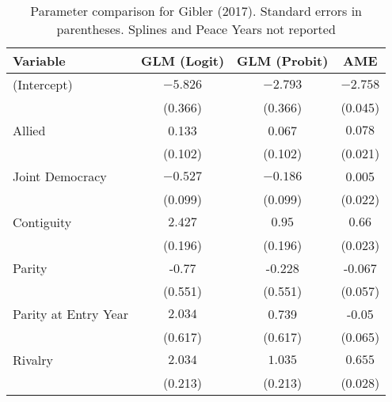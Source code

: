 \begin{table}[ht]
\centering
\begingroup\normalsize
\begin{tabular}{lccc}
 Variable & GLM (Logit) & GLM (Probit) & AME \\ 
  \hline
\hline
(Intercept) & $-5.826$ & $-2.793$ & $-2.758$ \\
   & (0.366) & (0.366) & (0.045) \\ 
  Allied & 0.133 & 0.067 & $0.078$ \\
   & (0.102) & (0.102) & (0.021) \\ 
  Joint Democracy & $-0.527$ & $-0.186$ & 0.005 \\
   & (0.099) & (0.099) & (0.022) \\ 
  Contiguity & $2.427$ & $0.95$ & $0.66$ \\
   & (0.196) & (0.196) & (0.023) \\ 
  Parity & -0.77 & -0.228 & -0.067 \\ 
   & (0.551) & (0.551) & (0.057) \\ 
  Parity at Entry Year & $2.034$ & 0.739 & -0.05 \\
   & (0.617) & (0.617) & (0.065) \\ 
  Rivalry & $2.034$ & $1.035$ & $0.655$ \\
   & (0.213) & (0.213) & (0.028) \\ 
   \hline
\hline
\end{tabular}
\endgroup
\caption{Parameter comparison for Gibler (2017). Standard errors in parentheses. Splines and Peace Years not reported} 
\label{tab:gibler_coef}
\end{table}
